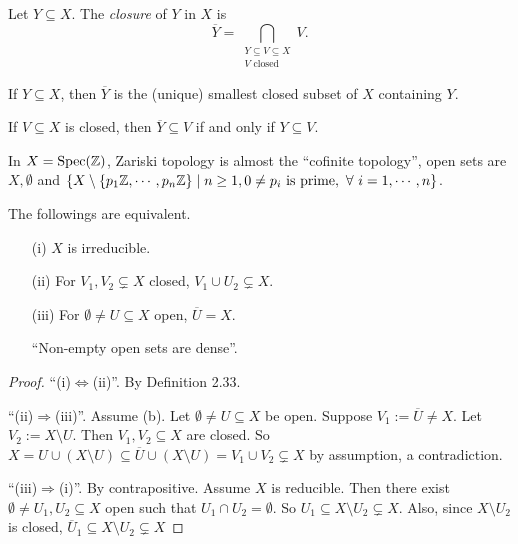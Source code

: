 \begin{definition}
    Let $Y \subseteq X$. The \emph{closure} of $Y$ in $X$ is 
    \[\overbar Y = \bigcap_{\substack{Y \subseteq V \subseteq X \\ V \text{ closed}}}V.\]
\end{definition}

\begin{fact}
    If $Y \subseteq X$, then $\overbar Y$ is the (unique) smallest closed subset of $X$ containing $Y$. \par 
    If $V \subseteq X$ is closed, then $\overbar Y \subseteq V$ if and only if $Y \subseteq V$.
\end{fact}

\begin{example*}
    In $X = \operatorname{Spec}(\mathbb{Z})$, Zariski topology is almost the ``cofinite topology'', open sets are $X,\emptyset$ and $\{X \setminus \{p_1\mathbb{Z},\cdots,p_n\mathbb{Z}\} \mid n \geq 1, 0 \neq p_i \text{ is prime},\ \forall \  i = 1,\cdots,n\}$.
\end{example*}

\begin{lemma}
    The followings are equivalent.
    \begin{enumerate}
        \item[(i)] $X$ is irreducible.
        \item[(ii)] For $V_1,V_2 \subsetneq X$ closed, $V_1 \cup U_2 \subsetneq X$.
        \item[(iii)] For $\emptyset \neq U \subseteq X$ open, $\overbar U = X$. \par 
            ``Non-empty open sets are dense''.
    \end{enumerate}
\end{lemma}

\begin{proof}
    ``(i)$\Leftrightarrow$(ii)''. By Definition 2.33. \par 
    ``(ii)$\Rightarrow$(iii)''. Assume (b). Let $\emptyset \neq U \subseteq X$ be open. Suppose $V_1 := \overbar U \neq X$. Let $V_2 := X \setminus U$. Then $V_1,V_2 \subseteq X$ are closed. So $X = U \cup (X \setminus U) \subseteq \overbar U \cup (X \setminus U) = V_1 \cup V_2 \subsetneq X$ by assumption, a contradiction. \par 
    ``(iii)$\Rightarrow$(i)''. By contrapositive. Assume $X$ is reducible. Then there exist $\emptyset \neq U_1,U_2 \subseteq X$ open such that $U_1 \cap U_2 = \emptyset$. So $U_1 \subseteq X \setminus U_2 \subsetneq X$. Also, since $X \setminus U_2$ is closed, $\overbar U_1 \subseteq X \setminus U_2 \subsetneq X$
\end{proof}

